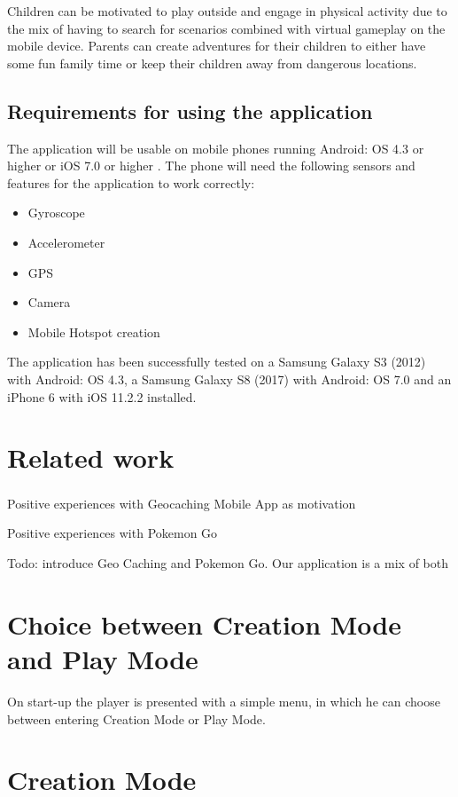 \documentclass{sigchi-ext}
\begin{document}
Children can be motivated to play outside and engage in physical activity due to the mix of having to search for scenarios combined with virtual gameplay on the mobile device. Parents can create adventures for their children to either have some fun family time or keep their children away from dangerous locations.

\subsection{Requirements for using the application}

The application will be usable on mobile phones running Android: OS 4.3 or higher or iOS 7.0 or higher \cite{unityRequirements}. The phone will need the following sensors and features for the application to work correctly:

\begin{itemize}\compresslist%
	\item Gyroscope
	\item Accelerometer
	\item GPS
	\item Camera
	\item Mobile Hotspot creation \cite{desc:hotspot}
\end{itemize}

The application has been successfully tested on a Samsung Galaxy S3 (2012) with Android: OS 4.3, a Samsung Galaxy S8 (2017) with Android: OS 7.0 and an iPhone 6 with iOS 11.2.2 installed.

\section{Related work}

Positive experiences with Geocaching\textsuperscript{\textregistered} Mobile App as motivation

Positive experiences with Pokemon Go

Todo: introduce Geo Caching and Pokemon Go. Our application is a mix of both

\section{Choice between Creation Mode and Play Mode}

On start-up the player is presented with a simple menu, in which he can choose between entering Creation Mode or Play Mode.

\section{Creation Mode} 
\label{sec:Creation}
\end{document}
